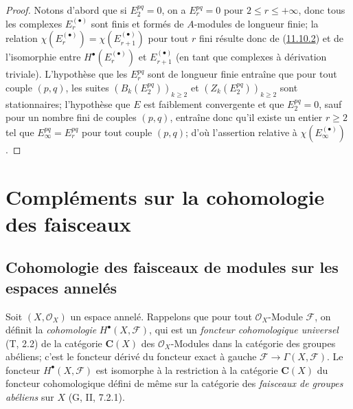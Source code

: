 \begin{proof}
Notons d'abord que si $E_2^{pq}=0$, on a $E_r^{pq}=0$ pour
$2\leq r\leq+\infty$, donc tous les complexes $E_r^{(\bullet)}$ sont finis et
formés de $A$-modules de longueur finie; la relation
$\chi(E_r^{(\bullet)})=\chi(E_{r+1}^{(\bullet)})$ pour tout $r$ fini résulte donc de
(\hyperref[0.11.10.2-fr]{11.10.2}) et de l'isomorphie entre
$H^\bullet(E_r^{(\bullet)})$ et $E_{r+1}^{(\bullet)}$ (en tant que complexes à
dérivation triviale). L'hypothèse que les $E_r^{pq}$ sont de longueur finie
entraîne que pour tout couple $(p,q)$, les suites
$(B_k(E_2^{pq}))_{k\geq2}$ et $(Z_k(E_2^{pq}))_{k\geq2}$ sont stationnaires;
l'hypothèse que $E$ est faiblement convergente et que $E_2^{pq}=0$, sauf
pour un nombre fini de couples $(p,q)$, entraîne donc qu'il existe un entier
$r\geq2$ tel que $E_\infty^{pq}=E_r^{pq}$ pour tout couple $(p,q)$; d'où
l'assertion relative à $\chi(E_\infty^{(\bullet)})$.
\end{proof}

\section{Compléments sur la cohomologie des faisceaux}
\label{section:0.12-fr}

\subsection{Cohomologie des faisceaux de modules sur les espaces annelés}
\label{subsection:0.12.1-fr}

\begin{env}[12.1.1]
\label{0.12.1.1-fr}
Soit $(X,\mathcal O_X)$ un espace annelé. Rappelons que pour tout
$\mathcal O_X$-Module $\mathcal F$, on définit la \emph{cohomologie}
$H^\bullet(X,\mathcal F)$, qui est un \emph{foncteur cohomologique universel}
(T, 2.2) de la catégorie $\boldsymbol{C}(X)$ des $\mathcal O_X$-Modules dans la catégorie
des groupes abéliens; c'est le foncteur dérivé du foncteur exact à gauche
$\mathcal F\to\Gamma(X,\mathcal F)$. Le foncteur $H^\bullet(X,\mathcal F)$
est isomorphe
à la restriction à la catégorie $\boldsymbol{C}(X)$ du foncteur cohomologique défini de
même sur la catégorie des \emph{faisceaux de groupes abéliens} sur $X$
(G, II, 7.2.1).
\end{env}


